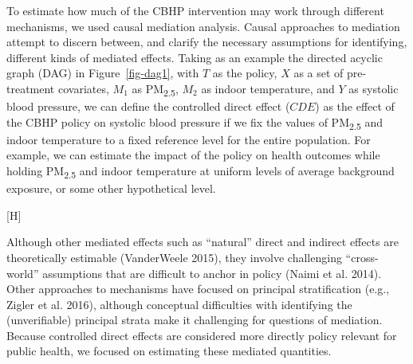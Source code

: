 \documentclass[
  letterpaper,
  DIV=11,
  numbers=noendperiod]{scrartcl}
\makeatletter
\renewenvironment{figure}%
   {\renewcommand\familydefault\sfdefault
    \@float{figure}}
   {\end@float}
\makeatother
\begin{document}
To estimate how much of the CBHP intervention may work through different
mechanisms, we used causal mediation analysis. Causal approaches to
mediation attempt to discern between, and clarify the necessary
assumptions for identifying, different kinds of mediated effects. Taking
as an example the directed acyclic graph (DAG) in Figure~\ref{fig-dag1},
with \(T\) as the policy, \(X\) as a set of pre-treatment covariates,
\(M_{1}\) as PM\textsubscript{2.5}, \(M_{2}\) as indoor temperature, and
\(Y\) as systolic blood pressure, we can define the controlled direct
effect (\(CDE\)) as the effect of the CBHP policy on systolic blood
pressure if we fix the values of PM\textsubscript{2.5} and indoor
temperature to a fixed reference level for the entire population. For
example, we can estimate the impact of the policy on health outcomes
while holding PM\textsubscript{2.5} and indoor temperature at uniform
levels of average background exposure, or some other hypothetical level.

\begin{figure}[H]


\caption{\label{fig-dag1}Hypothetical Directed Acyclic Graph showing
direct and indirect effects with outcome (\(Y\)), pre-treatment
covariates (\(X\)), policy (\(T\)), multiple mediators
(\(M_{1},M_{2}\)), as well as covariates for the mediators (\(W\)).}

\end{figure}%

Although other mediated effects such as ``natural'' direct and indirect
effects are theoretically estimable (VanderWeele 2015), they involve
challenging ``cross-world'' assumptions that are difficult to anchor in
policy (Naimi et al. 2014). Other approaches to mechanisms have focused
on principal stratification (e.g., Zigler et al. 2016), although
conceptual difficulties with identifying the (unverifiable) principal
strata make it challenging for questions of mediation. Because
controlled direct effects are considered more directly policy relevant
for public health, we focused on estimating these mediated quantities.
\end{document}
